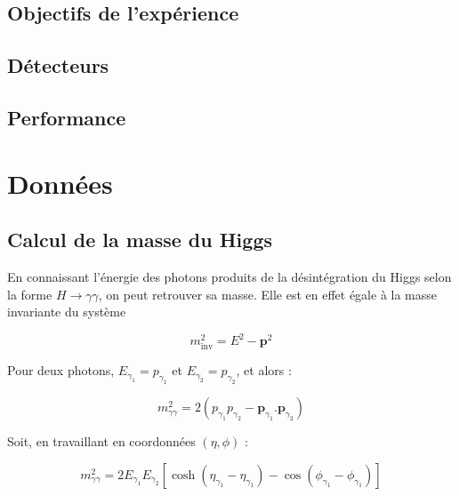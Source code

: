 \documentclass[11pt]{article} %
\begin{document}
\subsection{Objectifs de l'expérience}

\subsection{Détecteurs}

\subsection{Performance}
\subsection{}

\section{Données}

\subsection{Calcul de la masse du Higgs}

En connaissant l'énergie des photons produits de la désintégration du Higgs selon la forme $H\to \gamma \gamma$, on peut retrouver sa masse. Elle est en effet égale à la masse invariante du système 

\begin{equation}
m_{\textrm{inv}}^2 = E^2 - \textbf{p}^2
\end{equation}

Pour deux photons, $E_{\gamma_1} = p_{\gamma_1}$ et $E_{\gamma_2} = p_{\gamma_2}$, et alors :

\begin{equation}
m_{\gamma \gamma}^2 = 2 \left ( p_{\gamma_1} p_{\gamma_2} - \textbf{p}_{\gamma_1} . \textbf{p}_{\gamma_2} \right )
\end{equation}

Soit, en travaillant en coordonnées $(\eta, \phi)$ :

\begin{equation}
m_{\gamma \gamma}^2 = 2 E_{\gamma_1} E_{\gamma_2} \left [ \cosh {\left( \eta_{\gamma_1} - \eta_{\gamma_1} \right)} - \cos{\left( \phi_{\gamma_1} - \phi_{\gamma_1} \right)} \right ]
\end{equation}
\end{document}
